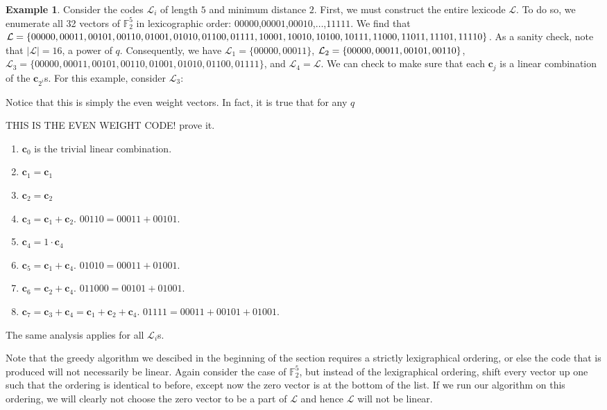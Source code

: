 \documentclass{article}
\numberwithin{theorem}{subsection}
\numberwithin{lemma}{subsection}
\theoremstyle{definition}
\newtheorem{exmp}{Example}
\numberwithin{exmp}{subsection}
\theoremstyle{definition}
\numberwithin{defn}{subsection}
\theoremstyle{definition}
\numberwithin{claim}{subsection}
\begin{document}
\begin{exmp}
Consider the codes $\mathcal{L}_i$ of length $5$ and minimum distance $2$.  First, we must construct the entire lexicode $\mathcal{L}$.  To do so, we enumerate
all 32 vectors of $\mathbb{F}_2^5$ in lexicographic order: $00000$,$00001$,$00010$,$\ldots$,$11111$.  We find that $\mathcal{L} = \{00000, 00011,00101,00110,01001,
01010,01100,01111,10001,10010,\\ 10100,10111,11000,11011,11101,11110\}$.  As a sanity check, note that $\left | \mathcal{L} \right | = 16$, a power of $q$.  Consequently, we have
$\mathcal{L}_1 = \{00000,00011\}$, $\mathcal{L}_2 = \{00000, 00011,00101,\\ 00110\}$, $\mathcal{L}_3 = \{00000, 00011,00101,00110,01001,01010,01100,01111\}$, and
$\mathcal{L}_4 = \mathcal{L}$. We can check to make sure that each $\mathbf{c}_j$ is a linear combination of the $\mathbf{c}_{2^i}$s. For this example, consider $\mathcal{L}_3$:  

Notice that this is simply the even weight vectors.  In fact, it is true that for any $q$

THIS IS THE EVEN WEIGHT CODE! prove it.


\begin{enumerate}[start=0]
\item $\mathbf{c}_0$ is the trivial linear combination.
\item $\mathbf{c}_1 = \mathbf{c}_1$
\item $\mathbf{c}_2 = \mathbf{c}_2$
\item $\mathbf{c}_3 = \mathbf{c}_1 + \mathbf{c}_2$.  $00110 = 00011+ 00101$.
\item $\mathbf{c}_4 = 1\cdot\mathbf{c}_4$
\item $\mathbf{c}_5 = \mathbf{c}_1 + \mathbf{c}_4$. $01010 = 00011 + 01001$.
\item $\mathbf{c}_6 = \mathbf{c}_2 + \mathbf{c}_4$. $011000 = 00101 + 01001$.
\item $\mathbf{c}_7 = \mathbf{c}_3 + \mathbf{c}_4 = \mathbf{c}_1 + \mathbf{c}_2 + \mathbf{c}_4$. $01111 = 00011 + 00101+01001$.
\end{enumerate}

The same analysis applies for all $\mathcal{L}_i$s.

\end{exmp}

Note that the greedy algorithm we descibed in the beginning of the section requires a strictly lexigraphical ordering, or else the code that is produced will not necessarily
be linear.  Again consider the case of $\mathbb{F}_2^5$, but instead of the lexigraphical ordering, shift every vector up one such that the ordering is identical to before, except now the
zero vector is at the bottom of the list.  If we run our algorithm on this ordering, we will clearly not choose the zero vector to be a part of $\mathcal{L}$ and hence 
$\mathcal{L}$ will not be linear.  
\end{document}
